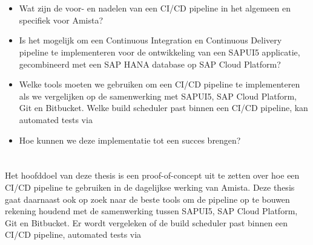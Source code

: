 \section{}
\label{sec:onderzoeksvraag}

\begin{itemize}
    \item Wat zijn de voor- en nadelen van een CI/CD pipeline in het algemeen en specifiek voor Amista?
    \item Is het mogelijk om een Continuous Integration en Continuous Delivery pipeline te implementeren voor de ontwikkeling van een SAPUI5 applicatie, gecombineerd met een SAP HANA database op SAP Cloud Platform?
    \item Welke tools moeten we gebruiken om een CI/CD pipeline te implementeren als we vergelijken op de samenwerking met SAPUI5, SAP Cloud Platform, Git en Bitbucket. Welke build scheduler past binnen een CI/CD pipeline, kan automated tests via %
    \item Hoe kunnen we deze implementatie tot een succes brengen?
    
\end{itemize}

\section{}
\label{sec:onderzoeksdoelstelling}

Het hoofddoel van deze thesis is een proof-of-concept uit te zetten over hoe een CI/CD pipeline te gebruiken in de dagelijkse werking van Amista.
Deze thesis gaat daarnaast ook op zoek naar de beste tools om de pipeline op te bouwen rekening houdend met de samenwerking tussen SAPUI5, SAP Cloud Platform, Git en Bitbucket. Er wordt vergeleken of de build scheduler past binnen een CI/CD pipeline, automated tests via %

